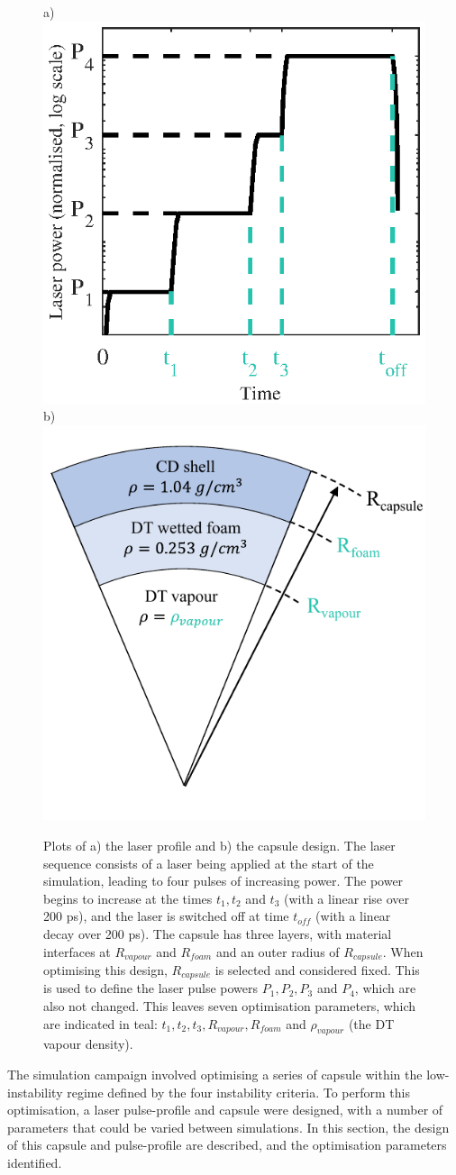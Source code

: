 \begin{figure}
\centering     %
\subfigure a){\label{fig:LaserProfile}\includegraphics[width=.45\textwidth]{figures/LowCR/LaserProfile_half.eps}}
\subfigure b){\label{fig:CapsuleDesign}\includegraphics[width=.45\textwidth]{figures/LowCR/Capsule.pdf}}
\caption{Plots of a) the laser profile and b) the capsule design. The laser sequence consists of a laser being applied at the start of the simulation, leading to four pulses of increasing power. The power begins to increase at the times $t_1, t_2$ and $t_3$ (with a linear rise over 200 \unit{\pico\second}), and the laser is switched off at time $t_{off}$ (with a linear decay over 200 \unit{\pico\second}). The capsule has three layers, with material interfaces at  $R_{vapour}$ and $R_{foam}$ and an outer radius of $R_{capsule}$. When optimising this design, $R_{capsule}$ is selected and considered fixed. This is used to define the laser pulse powers $P_1, P_2, P_3$ and $P_4$, which are also not changed. This leaves seven optimisation parameters, which are indicated in teal: $t_1, t_2, t_3, R_{vapour}, R_{foam}$ and $\rho_{vapour}$ (the DT vapour density).}
\end{figure}

The simulation campaign involved optimising a series of capsule within the low-instability regime defined by the four instability criteria. To perform this optimisation, a laser pulse-profile and capsule were designed, with a number of parameters that could be varied between simulations. In this section, the design of this capsule and pulse-profile are described, and the optimisation parameters identified.


